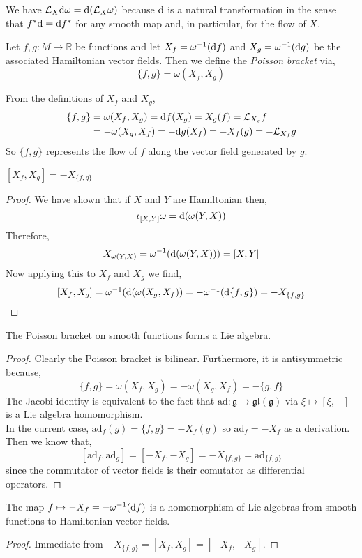 \documentclass[12pt]{extarticle}
\renewcommand{\L}{\mathcal{L}}
\newcommand{\R}{\mathbb{R}}
\begin{document}
\begin{remark}
We have $\L_X \d{\omega} = \d{(\L_X \omega)}$ because $\mathrm{d}$ is a natural transformation in the sense that $f^* \mathrm{d} = \mathrm{d} f^*$ for any smooth map and, in particular, for the flow of $X$. 
\end{remark}

\begin{definition}
Let $f, g : M \to \R$ be functions and let $X_f = \omega^{-1}(\mathrm{d}{f})$ and $X_g = \omega^{-1}(\mathrm{d}{g})$ be the associated Hamiltonian vector fields. Then we define the \textit{Poisson bracket} via,
\[ \{ f, g \} = \omega(X_f, X_g) \] 
\end{definition}

\begin{remark}
From the definitions of $X_f$ and $X_g$,
\begin{align*}
\{ f, g \} & = \omega(X_f, X_g) = \d{f}(X_g) = X_g(f) = \L_{X_g} f
\\
& = - \omega(X_g, X_f) = -\d{g}(X_f) = - X_f(g) = - \L_{X_f} g
\end{align*}
So $\{ f, g \}$ represents the flow of $f$ along the vector field generated by $g$. 
\end{remark}

\begin{lemma}
$[X_f, X_g] = - X_{\{ f, g \}}$ 
\end{lemma}

\begin{proof}
We have shown that if $X$ and $Y$ are Hamiltonian then,
\[ \iota_{[X,Y]} \omega = \mathrm{d}{(\omega(Y, X))} \]
Therefore,
\[ X_{\omega(Y, X)} = \omega^{-1}(\mathrm{d}{(\omega(Y, X))}) = [X, Y] \]
Now applying this to $X_f$ and $X_g$ we find,
\[ [X_f, X_g] = \omega^{-1}(\mathrm{d}{(\omega(X_g, X_f)}) = - \omega^{-1}(\mathrm{d} \{f, g \}) = - X_{\{ f, g \}} \]
\end{proof}

\begin{proposition}
The Poisson bracket on smooth functions forms a Lie algebra.
\end{proposition}

\newcommand{\ad}{\mathrm{ad}}

\begin{proof}
Clearly the Poisson bracket is bilinear. Furthermore, it is antisymmetric because,
\[ \{ f ,g \} = \omega(X_f, X_g) = - \omega(X_g, X_f) = - \{ g, f \} \]
The Jacobi identity is equivalent to the fact that $\ad : \mathfrak{g} \to \mathfrak{gl}(\mathfrak{g})$ via $\xi \mapsto [\xi, -]$ is a Lie algebra homomorphism. 
\bigskip\\
In the current case, $\ad_f(g) = \{ f, g \} = -X_f(g)$ so $\ad_f = -X_f$ as a derivation. Then we know that,
\[ [ \ad_f, \ad_g] = [-X_f, -X_g] = - X_{\{f, g\}} = \ad_{\{f, g \}} \]
since the commutator of vector fields is their comutator as differential operators. 
\end{proof}

\begin{proposition}
The map $f \mapsto -X_f = - \omega^{-1}(\mathrm{d}{f})$ is a homomorphism of Lie algebras from smooth functions to Hamiltonian vector fields.
\end{proposition}

\begin{proof}
Immediate from $-X_{\{f, g\}} = [X_f, X_g] = [- X_f, - X_g]$. 
\end{proof}
\end{document}
